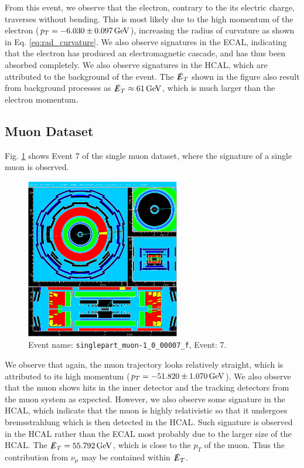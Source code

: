 \documentclass[a4paper]{report}
\numberwithin{equation}{section}
\begin{document}
From this event, we observe that the electron, contrary to the its electric charge, traverses without bending. This is most likely
due to the high momentum of the electron ($p_T = \SI{-6.03 \pm 0.097}{\giga\electronvolt}$), increasing the radius of curvature as shown in Eq. \ref{eq:rad_curvature}. We also observe 
signatures in the ECAL, indicating that the electron has produced an electromagnetic cascade, and has thus been absorbed completely. 
We also observe signatures in the HCAL, which are attributed to the background of the event. The $\slashed{E}_T$ shown in the 
figure also result from background processes as $\slashed{E}_T \approx \SI{61}{\giga\electronvolt}$, which is much larger than the 
electron momentum. \par 

\subsection{Muon Dataset}

Fig. \ref{fig:single_muon} shows Event 7 of the single muon dataset, where the signature of a single muon is observed. 

\begin{figure}[htpb]
    \centering
    \includegraphics[width=0.6\textwidth]{muon_event7.eps}
    \caption{Event name: \texttt{singlepart\_muon-1\_0\_00007\_f}, Event: 7. }
    \label{fig:single_muon}
\end{figure}

We observe that again, the muon trajectory looks relatively straight, which is attributed to its high momentum ($p_T = \SI{-51.82 \pm 1.070}{\giga\electronvolt}$).
We also observe that the muon shows hits in the inner detector and the tracking detectors from the muon system as expected. 
However, we also observe some signature in the HCAL, which indicate that the muon is highly relativistic so that it 
undergoes bremsstrahlung which is then detected in the HCAL. Such signature is observed in the HCAL rather than the ECAL most probably
due to the larger size of the HCAL. The $\slashed{E}_T = \SI{55.792}{\giga\electronvolt}$, which is close to the $p_T$ of the muon.
Thus the contribution from $\nu_\mu$ may be contained within $\slashed{E}_T$.
\end{document}
